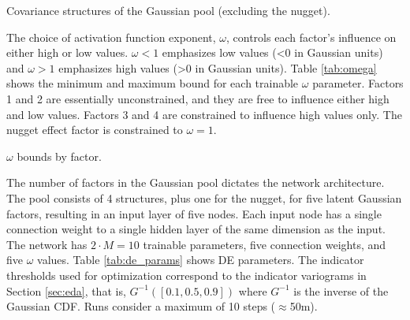 
\begin{table}[!htb]
    \centering
    \caption{Covariance structures of the Gaussian pool (excluding the nugget).}
    \resizebox{0.9\width}{!}{}
    \label{tab:pool}
\end{table}

The choice of activation function exponent, $\omega$, controls each factor's influence on either high or low values. $\omega < 1$ emphasizes low values (<0 in Gaussian units) and $\omega > 1$ emphasizes high values (>0 in Gaussian units). Table \ref{tab:omega} shows the minimum and maximum bound for each trainable $\omega$ parameter. Factors 1 and 2 are essentially unconstrained, and they are free to influence either high and low values. Factors 3 and 4 are constrained to influence high values only. The nugget effect factor is constrained to $\omega=1$.

\begin{table}[!htb]
    \centering
    \caption{$\omega$ bounds by factor.}
    \resizebox{0.9\width}{!}{}
    \label{tab:omega}
\end{table}

The number of factors in the Gaussian pool dictates the network architecture. The pool consists of 4 structures, plus one for the nugget, for five latent Gaussian factors, resulting in an input layer of five nodes. Each input node has a single connection weight to a single hidden layer of the same dimension as the input. The network has $2 \cdot M = 10$ trainable parameters, five connection weights, and five $\omega$ values. Table \ref{tab:de_params} shows \gls{DE} parameters. The indicator thresholds used for optimization correspond to the indicator variograms in Section \ref{sec:eda}, that is, $G^{-1}([0.1, 0.5, 0.9])$ where $G^{-1}$ is the inverse of the Gaussian \gls{CDF}. Runs consider a maximum of 10 steps ($\approx$50m).

